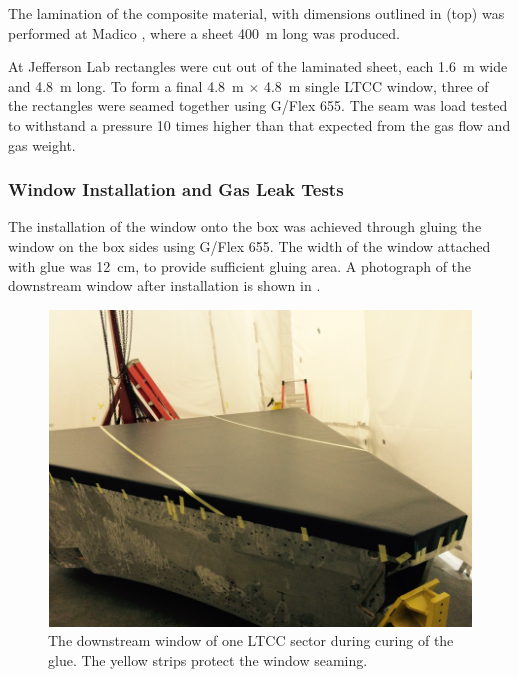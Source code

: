 The lamination of the composite material, with dimensions outlined in  (top) was performed
at Madico \cite{madico}, where a sheet 400~m long was produced.

At Jefferson Lab rectangles were cut out of the laminated sheet, each 1.6~m wide and 4.8~m long.
To form a final 4.8~m $\times$ 4.8~m single LTCC window, three of the rectangles were seamed together
using G/Flex 655. The seam was load tested to withstand a pressure 10 times higher than that expected from
the gas flow and gas weight.


\subsubsection{Window Installation and Gas Leak Tests}

The installation of the window onto the box was achieved through gluing the window on the box sides using
G/Flex 655. The width of the window
attached with glue was 12~cm, to provide sufficient gluing area.
A photograph of the downstream window after installation is shown in .

\begin{figure}
	\centering
	\includegraphics[width=1.0\columnwidth,keepaspectratio]{img/downstreamWindow.png}
	\caption{The downstream window of one LTCC sector during curing of the glue. The yellow strips protect the
          window seaming.}
	\label{fig:downstreamWindow}
\end{figure}

